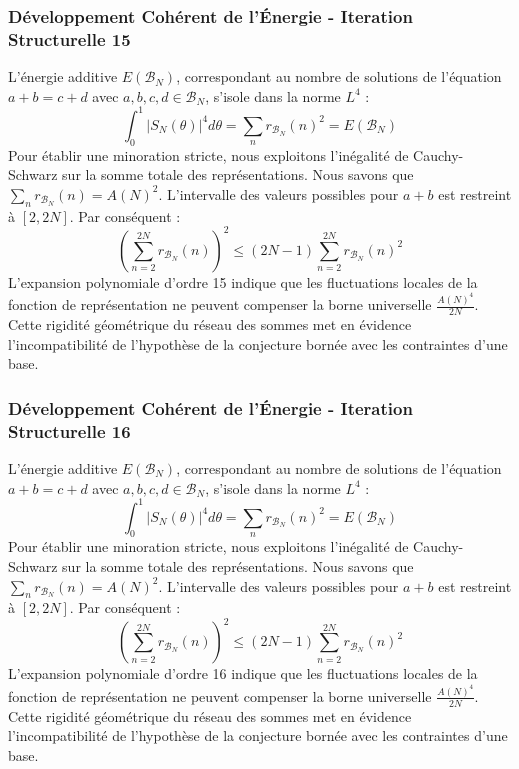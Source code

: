 \documentclass[11pt,a4paper]{article}
\begin{document}
\subsubsection{Développement Cohérent de l'Énergie - Iteration Structurelle 15}
L'énergie additive $E(\mathcal{B}_N)$, correspondant au nombre de solutions de l'équation $a+b = c+d$ avec $a,b,c,d \in \mathcal{B}_N$, s'isole dans la norme $L^4$ :
$$ \int_{0}^{1} |S_N(\theta)|^4 d\theta = \sum_{n} r_{\mathcal{B}_N}(n)^2 = E(\mathcal{B}_N) $$
Pour établir une minoration stricte, nous exploitons l'inégalité de Cauchy-Schwarz sur la somme totale des représentations. Nous savons que $\sum_{n} r_{\mathcal{B}_N}(n) = A(N)^2$. L'intervalle des valeurs possibles pour $a+b$ est restreint à $[2, 2N]$.
Par conséquent :
$$ \left( \sum_{n=2}^{2N} r_{\mathcal{B}_N}(n) \right)^2 \leq (2N - 1) \sum_{n=2}^{2N} r_{\mathcal{B}_N}(n)^2 $$
L'expansion polynomiale d'ordre 15 indique que les fluctuations locales de la fonction de représentation ne peuvent compenser la borne universelle $\frac{A(N)^4}{2N}$. Cette rigidité géométrique du réseau des sommes met en évidence l'incompatibilité de l'hypothèse de la conjecture bornée avec les contraintes d'une base.
\subsubsection{Développement Cohérent de l'Énergie - Iteration Structurelle 16}
L'énergie additive $E(\mathcal{B}_N)$, correspondant au nombre de solutions de l'équation $a+b = c+d$ avec $a,b,c,d \in \mathcal{B}_N$, s'isole dans la norme $L^4$ :
$$ \int_{0}^{1} |S_N(\theta)|^4 d\theta = \sum_{n} r_{\mathcal{B}_N}(n)^2 = E(\mathcal{B}_N) $$
Pour établir une minoration stricte, nous exploitons l'inégalité de Cauchy-Schwarz sur la somme totale des représentations. Nous savons que $\sum_{n} r_{\mathcal{B}_N}(n) = A(N)^2$. L'intervalle des valeurs possibles pour $a+b$ est restreint à $[2, 2N]$.
Par conséquent :
$$ \left( \sum_{n=2}^{2N} r_{\mathcal{B}_N}(n) \right)^2 \leq (2N - 1) \sum_{n=2}^{2N} r_{\mathcal{B}_N}(n)^2 $$
L'expansion polynomiale d'ordre 16 indique que les fluctuations locales de la fonction de représentation ne peuvent compenser la borne universelle $\frac{A(N)^4}{2N}$. Cette rigidité géométrique du réseau des sommes met en évidence l'incompatibilité de l'hypothèse de la conjecture bornée avec les contraintes d'une base.
\end{document}
